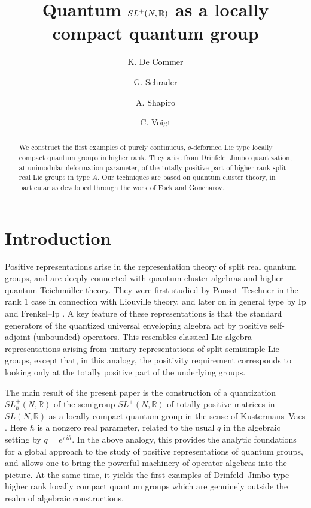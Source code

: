 \documentclass[11pt, reqno]{amsart}
\title{Quantum $SL^+(N,\R)$ as a locally compact quantum group}
\author{K. De Commer}
\author{G. Schrader}
\author{A. Shapiro}
\author{C. Voigt}
\theoremstyle{definition}
\numberwithin{equation}{section}
\def\R{\mathbb R}
\begin{document}
\begin{abstract}
We construct the first examples of purely continuous, $q$-deformed Lie type locally compact quantum groups in higher rank. They arise from Drinfeld--Jimbo quantization, at unimodular deformation parameter, of the totally positive part of higher rank split real Lie groups in type $A$. Our techniques are based on quantum cluster theory, in particular as developed through the work of Fock and Goncharov.
\end{abstract}



\maketitle

\section*{Introduction}

Positive representations arise in the representation theory of split real quantum groups, and are deeply connected with quantum cluster algebras and higher quantum Teichm\"uller theory. They were first studied by Ponsot--Teschner \cite{PT99, PT01} in the rank $ 1 $ case in connection with Liouville theory, and later on in general type by Ip and Frenkel--Ip \cite{Ip12, FI14, Ip15}. A key feature of these representations is that the standard generators of the quantized universal enveloping algebra act by positive self-adjoint (unbounded) operators. This resembles classical Lie algebra representations arising from unitary representations of split semisimple Lie groups, except that, in this analogy, the positivity requirement corresponds to looking only at the totally positive part of the underlying groups.  

The main result of the present paper is the construction of a quantization $SL^+_\hbar(N,\R)$ of the semigroup $SL^+(N,\R)$ of totally positive matrices in $ SL(N, \mathbb{R}) $ as a locally compact quantum group in the sense of Kustermans--Vaes \cite{KV00, KV03}. Here $ \hbar $ is a nonzero real parameter, related to the usual $q$ in the algebraic setting by $ q = e^{\pi i \hbar} $. In the above analogy, this provides the analytic foundations for a global approach to the study of positive representations of quantum groups, and allows one to bring the powerful machinery of operator algebras into the picture. At the same time, it yields the first examples of Drinfeld--Jimbo-type higher rank locally compact quantum groups which are genuinely outside the realm of algebraic constructions.
\end{document}
